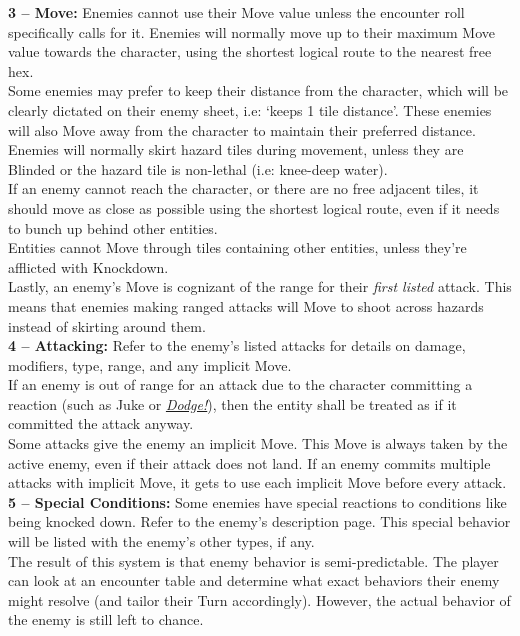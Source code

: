 \documentclass[12pt]{article}
\newcommand{\reftoit}[1]{\hyperlink{#1}{\emph{#1}}}
\begin{document}
\begin{multicols*}{2}
\textbf{3 -- Move:} Enemies cannot use their Move value unless the encounter roll specifically calls for it. Enemies will normally move up to their maximum Move value towards the character, using the shortest logical route to the nearest free hex.\\
Some enemies may prefer to keep their distance from the character, which will be clearly dictated on their enemy sheet, i.e: ‘keeps 1 tile distance’. These enemies will also Move away from the character to maintain their preferred distance.\\
Enemies will normally skirt hazard tiles during movement, unless they are Blinded or the hazard tile is non-lethal (i.e: knee-deep water).\\
If an enemy cannot reach the character, or there are no free adjacent tiles, it should move as close as possible using the shortest logical route, even if it needs to bunch up behind other entities.\\ 
Entities cannot Move through tiles containing other entities, unless they’re afflicted with Knockdown.\\
Lastly, an enemy’s Move is cognizant of the range for their \emph{first listed} attack. This means that enemies making ranged attacks will Move to shoot across hazards instead of skirting around them.\\

\textbf{4 -- Attacking:} Refer to the enemy’s listed attacks for details on damage, modifiers, type, range, and any implicit Move.\\
If an enemy is out of range for an attack due to the character committing a reaction (such as Juke or \reftoit{Dodge!}), then the entity shall be treated as if it committed the attack anyway.\\
Some attacks give the enemy an implicit Move. This Move is always taken by the active enemy, even if their attack does not land. If an enemy commits multiple attacks with implicit Move, it gets to use each implicit Move before every attack.\\

\textbf{5 -- Special Conditions:} Some enemies have special reactions to conditions like being knocked down. Refer to the enemy’s description page. This special behavior will be listed with the enemy’s other types, if any.\\

The result of this system is that enemy behavior is semi-predictable. The player can look at an encounter table and determine what exact behaviors their enemy might resolve (and tailor their Turn accordingly). However, the actual behavior of the enemy is still left to chance.


\end{multicols*}
\end{document}
